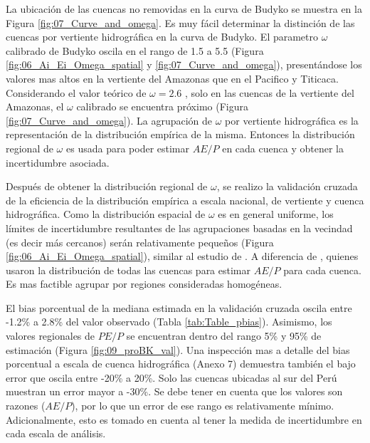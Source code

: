 \documentclass[12pt]{article}
\begin{document}


La ubicación de las cuencas no removidas en la curva de Budyko se muestra en la Figura \ref{fig:07_Curve_and_omega}. Es muy fácil determinar la distinción de las cuencas por vertiente hidrográfica en la curva de Budyko. El parametro $\omega$ calibrado de Budyko oscila en el rango de 1.5 a 5.5 (Figura \ref{fig:06_Ai_Ei_Omega_spatial} y \ref{fig:07_Curve_and_omega}), presentándose los valores mas altos en la vertiente del Amazonas que en el Pacifico y Titicaca. Considerando el valor teórico de $\omega = 2.6$ \citep{Fu1981}, solo en las cuencas de la vertiente del Amazonas, el $\omega$ calibrado se encuentra próximo (Figura \ref{fig:07_Curve_and_omega}). La agrupación de $\omega$ por vertiente hidrográfica es la representación de la distribución empírica de la misma. Entonces la distribución regional de $\omega$ es usada para poder estimar $AE/P$ en cada cuenca y obtener la incertidumbre asociada.

Después de obtener la distribución regional de $\omega$, se realizo la validación cruzada de la eficiencia de la distribución empírica a escala nacional, de vertiente y cuenca hidrográfica. Como la distribución espacial de $\omega$ es en general uniforme, los límites de incertidumbre resultantes de las agrupaciones basadas en la vecindad (es decir más cercanos) serán relativamente pequeños (Figura \ref{fig:06_Ai_Ei_Omega_spatial}), similar al estudio de \citet{Singh2015}. A diferencia de \citet{Greve2015}, quienes usaron la distribución de todas las cuencas para estimar $AE/P$ para cada cuenca. Es mas factible agrupar por regiones consideradas homogéneas.



El bias porcentual de la mediana estimada en la validación cruzada oscila entre -1.2\% a 2.8\% del valor observado (Tabla \ref{tab:Table_pbias}). Asimismo, los valores regionales de $PE/P$ se encuentran dentro del rango 5\% y 95\% de estimación (Figura \ref{fig:09_proBK_val}). Una inspección mas a detalle del bias porcentual a escala de cuenca hidrográfica (Anexo 7) demuestra también el bajo error que oscila entre -20\% a 20\%. Solo las cuencas ubicadas al sur del Perú muestran un error mayor a -30\%. Se debe tener en cuenta que los valores son razones ($AE/P$), por lo que un error de ese rango es relativamente mínimo. Adicionalmente, esto es tomado en cuenta al tener la medida de incertidumbre en cada escala de análisis.


\end{document}
